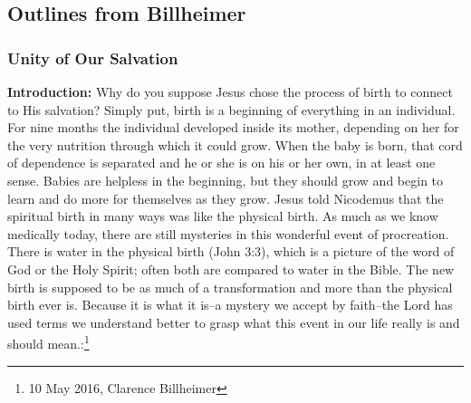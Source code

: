 \subsection{Outlines from Billheimer}

\subsubsection{Unity of Our Salvation}

\textbf{Introduction:} Why do you suppose Jesus chose the process of birth to connect to His salvation? Simply put, birth is a beginning of everything in an individual. For nine months the individual developed inside its mother, depending on her for the very nutrition through which it could grow. When the baby is born, that cord of dependence is separated and he or she is on his or her own, in at least one sense. Babies are helpless in the beginning, but they should grow and begin to learn and do more for themselves as they grow.  Jesus told Nicodemus that the spiritual birth in many ways was like the physical birth. As much as we know medically today, there are still mysteries in this wonderful event of procreation. There is water in the physical birth   (John 3:3), which is a picture of the word of God or the Holy Spirit; often both are compared to water in the Bible. The new birth is supposed to be as much of a transformation and more than the physical birth ever is. Because it is what it is--a mystery we accept by faith--the Lord has used terms we understand better to grasp what this event in our life really is and should mean.:\footnote{10 May 2016, Clarence Billheimer}
